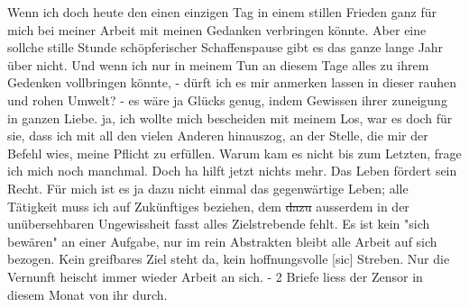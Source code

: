 \def\day{am 1. Mai 1943}
\mktitle

Wenn ich doch heute den einen einzigen Tag in einem stillen Frieden ganz f\"{u}r mich bei meiner Arbeit mit meinen Gedanken verbringen k\"{o}nnte.
Aber eine sollche stille Stunde sch\"{o}pferischer Schaffenspause gibt es das ganze lange Jahr \"{u}ber nicht.
Und wenn ich nur in meinem Tun an diesem Tage alles zu ihrem Gedenken vollbringen k\"{o}nnte, - d\"{u}rft ich es mir anmerken lassen in dieser rauhen und rohen Umwelt?
- es w\"{a}re ja Gl\"{u}cks genug, indem Gewissen ihrer zuneigung in ganzen Liebe.
ja, ich wollte mich bescheiden mit meinem Los, war es doch f\"{u}r sie, dass ich mit all den vielen Anderen hinauszog, an der Stelle, die mir der Befehl wies, meine Pflicht zu erf\"{u}llen.
Warum kam es nicht bis zum Letzten, frage ich mich noch manchmal.
Doch ha hilft jetzt nichts mehr.
Das Leben f\"{o}rdert sein Recht.
F\"{u}r mich ist es ja dazu nicht einmal das gegenw\"{a}rtige Leben; alle T\"{a}tigkeit muss ich auf Zuk\"{u}nftiges beziehen, dem \st{dazu} ausserdem in der un\"{u}bersehbaren Ungewissheit fasst alles Zielstrebende fehlt.
Es ist kein "sich bew\"{a}ren" an einer Aufgabe, nur im rein Abstrakten bleibt alle Arbeit auf sich bezogen.
Kein greifbares Ziel steht da, kein hoffnungsvolle{\color{red} [sic] } Streben.
Nur die Vernunft heischt immer wieder Arbeit an sich.
- 2 Briefe liess der Zensor in diesem Monat von ihr durch.

\clearpage
